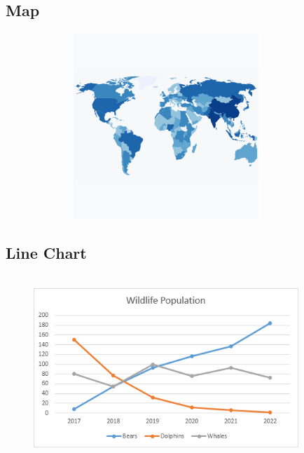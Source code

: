\documentclass[12pt]{article}
\begin{document}
\subsection*{Map}
\begin{figure}[h]
    \centering
    \includegraphics[width=10cm, height=7cm]{choropleth_basic.png}
    \centering
\end{figure}

\newpage

\subsection*{Line Chart}
\begin{figure}[h]
    \centering
    \includegraphics[width=10cm, height=7cm]{line-chart.png}
    \centering
\end{figure}
\end{document}

